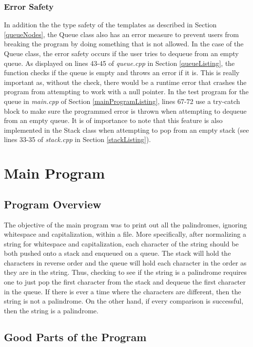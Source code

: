 \documentclass[letterpaper, 10pt,DIV=13]{scrartcl}
\numberwithin{equation}{section} %
\numberwithin{figure}{section} %
\numberwithin{table}{section} %
\begin{document}
\subsubsection{Error Safety}
In addition the the type safety of the templates as described in Section \ref{queueNodes}, the Queue class also has an error measure to prevent users from breaking
the program by doing something that is not allowed. In the case of the Queue class, the error safety occurs if the user tries to dequeue from an empty queue. As displayed on
lines 43-45 of \textit{queue.cpp} in Section \ref{queueListing}, the function checks if the queue is empty and throws an error if it is. This is really important
as, without the check, there would be a runtime error that crashes the program from attempting to work with a null pointer. In the test program for the queue in \textit{main.cpp} of
Section \ref{mainProgramListing}, lines 67-72 use a try-catch block to make sure the programmed error is thrown when attempting to dequeue from an
empty queue. It is of importance to note that this feature is also implemented in the Stack class when attempting to pop from an empty stack (see lines 
33-35 of \textit{stack.cpp} in Section \ref{stackListing}).

\section{Main Program}
\subsection{Program Overview}
The objective of the main program was to print out all the palindromes, ignoring whitespace and capitalization, within a file. More specifically, after normalizing
a string for whitespace and capitalization, each character of the string should be both pushed onto a stack and enqueued on a queue. The stack will hold the
characters in reverse order and the queue will hold each character in the order as they are in the string. Thus, checking to see if the string is a palindrome requires
one to just pop the first character from the stack and dequeue the first character in the queue. If there is ever a time where the characters are different, then
the string is not a palindrome. On the other hand, if every comparison is successful, then the string is a palindrome.


\subsection{Good Parts of the Program}
\end{document}
